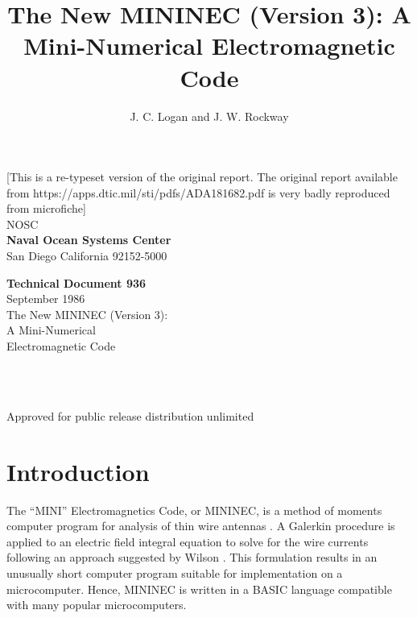 \documentclass[12pt]{article}
\title{The New MININEC (Version 3): A Mini-Numerical Electromagnetic Code}
\author{J. C. Logan and J. W. Rockway}
\begin{document}
\begin{titlepage}
\noindent
{\footnotesize
[This is a re-typeset version of the original report. The original
report available from https://apps.dtic.mil/sti/pdfs/ADA181682.pdf is
very badly reproduced from microfiche]}\\[.5cm]

\noindent
{\huge NOSC}\\[3mm]
{\large \textbf{Naval Ocean Systems Center}\\
San Diego California 92152-5000}\\

\begin{flushright}
{\large \textbf{Technical Document 936}}\\
{\large September 1986}\\[1cm]

{\LARGE
{The New MININEC (Version 3):\\A Mini-Numerical\\Electromagnetic Code}\\
\Large{}
}
\end{flushright}

\ \\[7cm]
\\[-5mm]

\begin{center}
{\footnotesize Approved for public release distribution unlimited}
\end{center}

\end{titlepage}



\newcommand{\dd}[1]{\mathrm{d}#1}
\newcommand{\vect}[1]{\bar{#1}}
\newcommand{\Einc}{\vect{E}_{\mathrm{inc}}}
\newcommand{\Hplus}{\stackrel{+}{H}}
\newcommand{\Aplus}{\stackrel{+}{A}}
\newcommand{\Pin}{P_{\mbox{\tiny IN}}}
\newcommand{\ave}[1]{#1_{\mbox{ave}}}
\newcommand{\peak}[1]{#1_{\mbox{peak}}}
\newcommand{\bounce}[1]{#1_{\mbox{\tiny bounce}}}
\newcommand{\jj}{\mbox{j\,}}
\newcommand{\RE}{\mathrm{Re}}

\clearpage
\tableofcontents
\clearpage

\section{Introduction}
The ``MINI'' Electromagnetics Code, or MININEC, is a method of moments
computer program for analysis of thin wire antennas \cite{r1}. A
Galerkin procedure is applied to an electric field integral equation to
solve for the wire currents following an approach suggested by Wilson
\cite{r2}. This formulation results in an unusually short computer
program suitable for implementation on a microcomputer. Hence, MININEC
is written in a BASIC language compatible with many popular
microcomputers.
\end{document}
